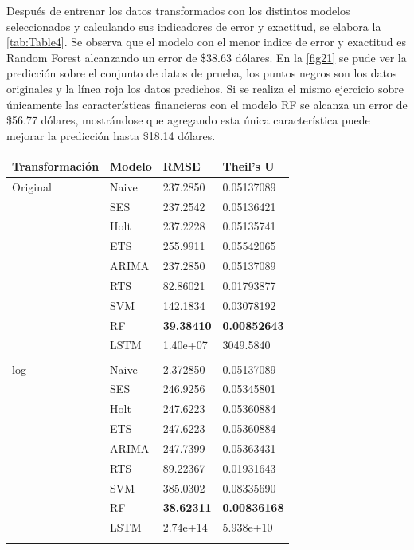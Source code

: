 Después de entrenar los datos transformados con los distintos modelos seleccionados y calculando sus indicadores de error y exactitud, se elabora la \cref{tab:Table4}. Se observa que el modelo con el menor indice de error y exactitud es Random Forest alcanzando un error de \$38.63 dólares.
En la \cref{fig21} se pude ver la predicción sobre el conjunto de datos de prueba, los puntos negros son los datos originales y la línea roja los datos predichos. Si se realiza el mismo ejercicio sobre únicamente las características financieras con el modelo RF se alcanza un error de \$56.77 dólares, mostrándose que agregando esta única característica puede mejorar la predicción hasta \$18.14 dólares.
 
\begin{table}
	\centering
	\begin{adjustbox}{width=0.83\textwidth}
	\begin{tabular}{m{5cm} m{3.5cm} m{3cm} m{3cm} }
		\toprule
		\textbf{Transformación} & \textbf{Modelo} & \textbf{RMSE} & \textbf{Theil’s U}\\
		\midrule
		Original&Naive & 237.2850  & 0.05137089\\
		&SES   & 237.2542  & 0.05136421\\
		&Holt  & 237.2228  & 0.05135741\\
		&ETS   & 255.9911  & 0.05542065\\
		&ARIMA & 237.2850  & 0.05137089\\
		&RTS   & 82.86021   & 0.01793877\\
		&SVM   & 142.1834   & 0.03078192\\
		&RF    & \textbf{39.38410}   & \textbf{0.00852643}\\
		&LSTM  & 1.40e+07  & 3049.5840\\ \\
		log	&Naive & 2.372850  & 0.05137089\\
		&SES   & 246.9256  & 0.05345801\\
		&Holt  & 247.6223  & 0.05360884\\
		&ETS   & 247.6223  & 0.05360884\\
		&ARIMA & 247.7399 & 0.05363431\\
		&RTS   & 89.22367   & 0.01931643\\
		&SVM   & 385.0302   & 0.08335690\\
		&RF    & \textbf{38.62311}   & \textbf{0.00836168}\\
		&LSTM  & 2.74e+14  & 5.938e+10\\ \\

\end{tabular}
\end{adjustbox}
\end{table}
